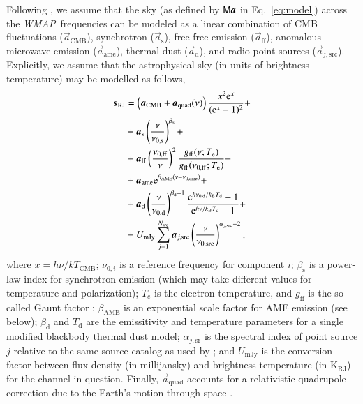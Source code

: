 \documentclass[twocolumn]{../../common/aa}
\def\WMAP{\emph{WMAP}}
\renewcommand{\a}[0]{\vec{a}}
\newcommand{\M}[0]{\tens{M}}
\newcommand{\Te}[0]{T_{\rm e}}
\newcommand{\e}{\mathrm e}
\def\Tdust{\ifmmode T_\mathrm{d}\else $T_{\mathrm{d}}$\fi}
\def\bdust{\ifmmode \beta_\mathrm{d}\else $\beta_{\mathrm{d}}$\fi}
\def\bsynch{\ifmmode \beta_\mathrm{s}\else $\beta_{\mathrm{s}}$\fi}
\def\nuzeros{\ifmmode \nu_{0,\mathrm{s}}\else $\nu_{0,\mathrm{s}}$\fi}
\def\nuzeroff{\ifmmode \nu_{0,\mathrm{ff}}\else $\nu_{0,\mathrm{ff}}$\fi}
\def\nuzerod{\ifmmode \nu_{0,\mathrm{d}}\else $\nu_{0,\mathrm{d}}$\fi}
\def\nuzeroame{\ifmmode \nu_{0,\mathrm{ame}}\else $\nu_{0,\mathrm{ame}}$\fi}
\def\nuzerosrc{\ifmmode \nu_{0,\mathrm{src}}\else $\nu_{0,\mathrm{src}}$\fi}
\def\nup{\ifmmode \nu_{\mathrm{p}}\else $\nu_{\mathrm{p}}$\fi}
\def\Te{\ifmmode T_{\mathrm{e}}\else $T_{\mathrm{e}}$\fi}
\def\kB{\ifmmode k_\mathrm{B}\else $k_{\mathrm{B}}$\fi}
\begin{document}
Following \citet{bp01}, we assume that the sky (as defined by $\M\boldsymbol a$ in Eq.~\ref{eq:model}) across the \WMAP\ frequencies can be modeled as a linear combination of CMB fluctuations ($\vec{a}_{\mathrm{CMB}}$), synchrotron ($\vec{a}_{\mathrm{s}}$), free-free emission ($\vec{a}_{\mathrm{ff}}$), anomalous microwave emission ($\vec{a}_{\mathrm{ame}}$), thermal dust ($\vec{a}_{\mathrm{d}}$), and radio point sources ($\vec{a}_{j,\mathrm{src}}$). Explicitly, we assume that the astrophysical sky (in units of brightness temperature) may be modelled as follows,
\begin{align}
  \vec{s}_{\mathrm{RJ}} &= \left(\vec{a}_{\mathrm{CMB}}+\vec{a}_{\mathrm{quad}}(\nu)\right) \frac{x^2 \e^x}{(\e^x -1)^2}+\label{eq:cmb_astsky}\\
  &+ \vec{a}_{\mathrm{s}} \left(\frac{\nu}{\nuzeros}\right)^{\bsynch} + \label{eq:synch_astsky}\\
  &+ \vec{a}_{\mathrm{ff}} \left(\frac{\nuzeroff}{\nu}\right)^2 \frac{g_{\mathrm{ff}}(\nu;\Te) }{g_{\mathrm{ff}}(\nuzeroff;\Te)} +\label{eq:ff_astsky}\\
  &+ \vec{a}_{\mathrm{ame}} \e^{\beta_{\mathrm{AME}}(\nu-\nu_{0,\mathrm{ame}})}+\label{eq:ame_astsky}  \\
  &+ \vec{a}_{\mathrm{d}} \left(\frac{\nu}{\nuzerod}\right)^{\bdust+1} \frac{\e^{h\nuzerod/\kB\Tdust}-1}{\e^{h\nu/\kB\Tdust}-1}+ \label{eq:dust_astsky}\\
  &+ U_{\mathrm{mJy}} \sum_{j=1}^{N_{\mathrm{src}}} \vec{a}_{j,\mathrm{src}} \left(\frac{\nu}{\nuzerosrc}\right)^{\alpha_{j,\mathrm{src}}-2}, \label{eq:sum_ptsrc}
\end{align}
where $x=h\nu/kT_{\mathrm{CMB}}$; $\nu_{0,i}$ is a reference frequency for component $i$; $\beta_{\mathrm{s}}$ is a power-law index for synchrotron emission (which may take different values for temperature and polarization); $T_e$ is the electron temperature, and $g_{\mathrm{ff}}$ is the so-called Gaunt factor \citep{dickinson2003}; $\beta_{\mathrm{AME}}$ is an exponential scale factor for AME emission (see below); $\beta_{\mathrm{d}}$ and $T_{\mathrm{d}}$ are the emissitivity and temperature parameters for a single modified blackbody thermal dust model; $\alpha_{j,\mathrm{sr}}$ is the spectral index of point source $j$ relative to the same source catalog as used by \citet{planck2016-l04}; and $U_{\mathrm{mJy}}$ is the conversion factor between flux density (in millijansky) and brightness temperature (in $\mathrm{K_{RJ}}$) for the channel in question. Finally, $\a_{\mathrm{quad}}$ accounts for a relativistic quadrupole correction due to the Earth's motion through space \citep{Notari:2015}.
\end{document}
